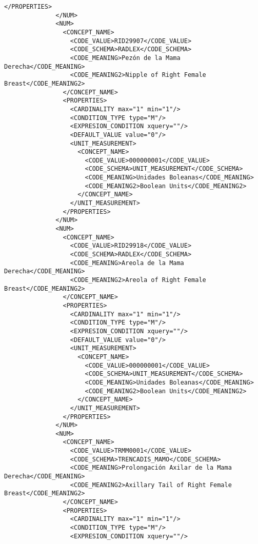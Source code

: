 \begin{lstlisting}[label=dicom-report,caption=Informe estructurado de una exploración de mama]
                </PROPERTIES>
              </NUM>
              <NUM>
                <CONCEPT_NAME>
                  <CODE_VALUE>RID29907</CODE_VALUE>
                  <CODE_SCHEMA>RADLEX</CODE_SCHEMA>
                  <CODE_MEANING>Pezón de la Mama Derecha</CODE_MEANING>
                  <CODE_MEANING2>Nipple of Right Female Breast</CODE_MEANING2>
                </CONCEPT_NAME>
                <PROPERTIES>
                  <CARDINALITY max="1" min="1"/>
                  <CONDITION_TYPE type="M"/>
                  <EXPRESION_CONDITION xquery=""/>
                  <DEFAULT_VALUE value="0"/>
                  <UNIT_MEASUREMENT>
                    <CONCEPT_NAME>
                      <CODE_VALUE>000000001</CODE_VALUE>
                      <CODE_SCHEMA>UNIT_MEASUREMENT</CODE_SCHEMA>
                      <CODE_MEANING>Unidades Boleanas</CODE_MEANING>
                      <CODE_MEANING2>Boolean Units</CODE_MEANING2>
                    </CONCEPT_NAME>
                  </UNIT_MEASUREMENT>
                </PROPERTIES>
              </NUM>
              <NUM>
                <CONCEPT_NAME>
                  <CODE_VALUE>RID29918</CODE_VALUE>
                  <CODE_SCHEMA>RADLEX</CODE_SCHEMA>
                  <CODE_MEANING>Areola de la Mama Derecha</CODE_MEANING>
                  <CODE_MEANING2>Areola of Right Female Breast</CODE_MEANING2>
                </CONCEPT_NAME>
                <PROPERTIES>
                  <CARDINALITY max="1" min="1"/>
                  <CONDITION_TYPE type="M"/>
                  <EXPRESION_CONDITION xquery=""/>
                  <DEFAULT_VALUE value="0"/>
                  <UNIT_MEASUREMENT>
                    <CONCEPT_NAME>
                      <CODE_VALUE>000000001</CODE_VALUE>
                      <CODE_SCHEMA>UNIT_MEASUREMENT</CODE_SCHEMA>
                      <CODE_MEANING>Unidades Boleanas</CODE_MEANING>
                      <CODE_MEANING2>Boolean Units</CODE_MEANING2>
                    </CONCEPT_NAME>
                  </UNIT_MEASUREMENT>
                </PROPERTIES>
              </NUM>
              <NUM>
                <CONCEPT_NAME>
                  <CODE_VALUE>TRMM0001</CODE_VALUE>
                  <CODE_SCHEMA>TRENCADIS_MAMO</CODE_SCHEMA>
                  <CODE_MEANING>Prolongación Axilar de la Mama Derecha</CODE_MEANING>
                  <CODE_MEANING2>Axillary Tail of Right Female Breast</CODE_MEANING2>
                </CONCEPT_NAME>
                <PROPERTIES>
                  <CARDINALITY max="1" min="1"/>
                  <CONDITION_TYPE type="M"/>
                  <EXPRESION_CONDITION xquery=""/>

\end{lstlisting}
